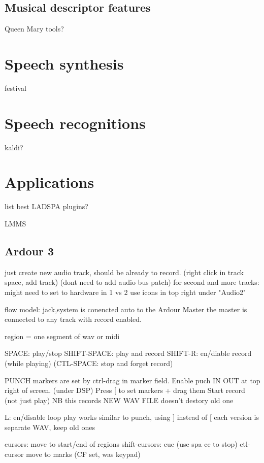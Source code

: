 \documentclass[oneside,english]{scrbook}
\begin{document}
\section{Musical descriptor features}
Queen Mary tools?
\chapter{Speech synthesis}

festival


\chapter{Speech recognitions}

kaldi?


\chapter{Applications}

list best LADSPA plugins?

LMMS

\section{Ardour 3}

just create new audio track, should be already to record. 
	(right click in track space, add track)
	(dont need to add audio bus patch) 
	for second and more tracks:
		might need to set to hardware in 1 vs 2
			use icons in top right under "Audio2"

flow model:
	jack,system is conencted auto to the Ardour Master
	the master is connected to any track with record enabled.

region = one segment of wav or midi

SPACE: 		play/stop
SHIFT-SPACE:  	play and record  
SHIFT-R:  	en/diable record (while playing)
(CTL-SPACE: 	stop and forget record)

PUNCH markers are set by ctrl-drag in marker field. 
	Enable puch IN OUT at top right of screen. (under DSP) 
	Press [ to set markers + drag them
	Start record (not just play)
	NB this records NEW WAV FILE doesn't destory old one
 
L: 	en/disable loop play
	works similar to punch, using ] instead of [
	each version is separate WAV, keep old ones	

cursors: 	move to start/end of regions
shift-cursors: 	cue (use spa  ce to stop)
ctl-cursor 	move to marks (CF set, was keypad)
\end{document}
